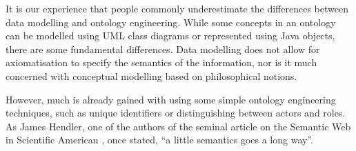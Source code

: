 It is our experience that people commonly underestimate the differences between data modelling and ontology engineering. While some concepts in an ontology can be modelled using UML class diagrams or represented using Java objects, there are some fundamental differences. Data modelling does not allow for axiomatisation to specify the semantics of the information, nor is it much concerned with conceptual modelling based on philosophical notions. 

However, much is already gained with using some simple ontology engineering techniques, such as unique identifiers or distinguishing between actors and roles. As James Hendler, one of the authors of the seminal article on the Semantic Web in Scientific American \cite{Berners-Lee2001}, once stated, ``a little semantics goes a long way''.





% 


% 

